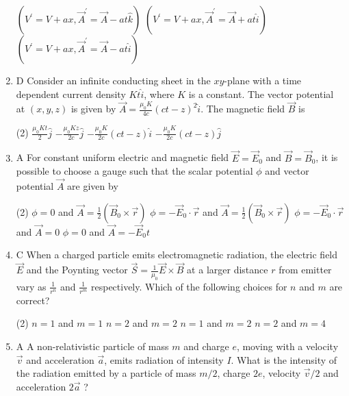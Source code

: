 \begin{enumerate}
\begin{tasks}
	\task[\textbf{b.}]$\left(V^{\prime}=V+a x, \vec{A}^{\prime}=\vec{A}-a t \hat{k}\right)$
	\task[\textbf{c.}]$\left(V^{\prime}=V+a x, \vec{A}^{\prime}=\vec{A}+a t \hat{i}\right)$
	\task[\textbf{d.}] $\left(V^{\prime}=V+a x, \vec{A}^{\prime}=\vec{A}-a t \hat{i}\right)$
\end{tasks}
\item D Consider an infinite conducting sheet in the $x y$-plane with a time dependent current density $K t \hat{i}$, where $K$ is a constant. The vector potential at $(x, y, z)$ is given by $\vec{A}=\frac{\mu_{0} K}{4 c}(c t-z)^{2} \hat{i}$. The magnetic field $\vec{B}$ is
{}
 \begin{tasks}(2)
	\task[\textbf{a.}]$\frac{\mu_{0} K t}{2} \hat{j}$
	\task[\textbf{b.}]$-\frac{\mu_{0} K z}{2 c} \hat{j}$
	\task[\textbf{c.}] $-\frac{\mu_{0} K}{2 c}(c t-z) \hat{i}$
	\task[\textbf{d.}]  $-\frac{\mu_{0} K}{2 c}(c t-z) \hat{j}$
\end{tasks}
\item A For constant uniform electric and magnetic field $\vec{E}=\vec{E}_{0}$ and $\vec{B}=\vec{B}_{0}$, it is possible to choose a gauge such that the scalar potential $\phi$ and vector potential $\vec{A}$ are given by 
{}
 \begin{tasks}(2)
	\task[\textbf{a.}]$\phi=0$ and $\vec{A}=\frac{1}{2}\left(\vec{B}_{0} \times \vec{r}\right)$
	\task[\textbf{b.}]$\phi=-\vec{E}_{0} \cdot \vec{r}$ and $\vec{A}=\frac{1}{2}\left(\vec{B}_{0} \times \vec{r}\right)$
	\task[\textbf{c.}]$\phi=-\vec{E}_{0} \cdot \vec{r}$ and $\vec{A}=0$
	\task[\textbf{d.}] $\phi=0$ and $\vec{A}=-\vec{E}_{0} t$
\end{tasks}
\item C When a charged particle emits electromagnetic radiation, the electric field $\vec{E}$ and the Poynting vector $\vec{S}=\frac{1}{\mu_{0}} \vec{E} \times \vec{B}$ at a larger distance $r$ from emitter vary as $\frac{1}{r^{n}}$ and $\frac{1}{r^{m}}$ respectively. Which of the following choices for $n$ and $m$ are correct?
{}
 \begin{tasks}(2)
	\task[\textbf{a.}]$n=1$ and $m=1$
	\task[\textbf{b.}] $n=2$ and $m=2$
	\task[\textbf{c.}]$n=1$ and $m=2$
	\task[\textbf{d.}] $n=2$ and $m=4$
\end{tasks}
\item A A non-relativistic particle of mass $m$ and charge $e$, moving with a velocity $\vec{v}$ and acceleration $\vec{a}$, emits radiation of intensity $I$. What is the intensity of the radiation emitted by a particle of mass $m / 2$, charge $2 e$, velocity $\vec{v} / 2$ and acceleration $2 \vec{a}$ ?

\end{enumerate}
